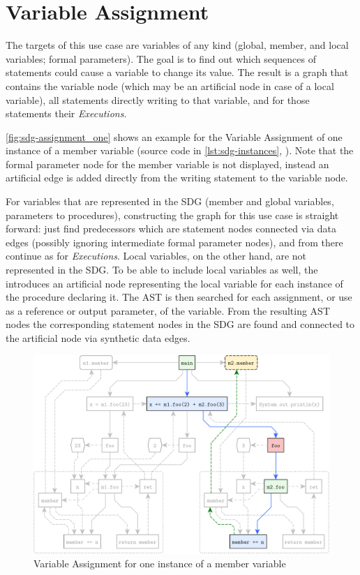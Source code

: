 \section{Variable Assignment}

The targets of this use case are variables of any kind (global, member, and local variables; formal parameters). The 
goal is to find out which sequences of statements could cause a variable to change its value. The result is a graph 
that contains the variable node (which may be an artificial node in case of a local variable), all statements directly 
writing to that variable, and for those statements their \emph{Executions}.

\autoref{fig:sdg-assignment_one} shows an example for the Variable Assignment of one instance of a member variable 
(source code in \autoref{lst:sdg-instances}, ). Note that the formal parameter node for 
the member variable is not displayed, instead an artificial edge is added directly from the writing statement to the 
variable node.

For variables that are represented in the SDG (member and global variables, parameters to procedures), constructing the 
graph for this use case is straight forward: just find predecessors which are statement nodes connected via data edges 
(possibly ignoring intermediate formal parameter nodes), and from there continue as for \emph{Executions}. Local 
variables, on the other hand, are not represented in the SDG. To be able to include local variables as well, the \SB 
introduces an artificial node representing the local variable for each instance of the procedure declaring it. The AST 
is then searched for each assignment, or use as a reference or output parameter, of the variable. From the resulting 
AST nodes the corresponding statement nodes in the SDG are found and connected to the artificial node via synthetic 
data edges.

\begin{figure}[hp]
  \centering
    \includegraphics[scale=0.6]{sdgs/assignment_one}
  \caption{Variable Assignment for one instance of a member variable}
  \label{fig:sdg-assignment_one}
\end{figure}


